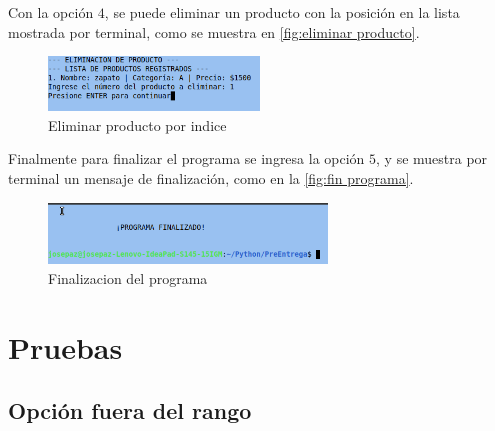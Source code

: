 \documentclass[12pt]{article}
\begin{document}
Con la opción $4$, se puede eliminar un producto con la posición en la lista mostrada por terminal, como se muestra en \autoref{fig:eliminar producto}.

\begin{figure}[H]
	\centering
	\setlength{\fboxrule}{0pt}
	\includegraphics[width=0.5\textwidth]{Imagenes/img5.png}
	\caption{Eliminar producto por indice}
	\label{fig:eliminar producto}
\end{figure} 

Finalmente para finalizar el programa se ingresa la opción $5$, y se muestra por terminal un mensaje de finalización, como en la \autoref{fig:fin programa}.
\begin{figure}[H]
	\centering
	\setlength{\fboxrule}{0pt}
	\includegraphics[width=0.66\textwidth]{Imagenes/img6.png}
	\caption{Finalizacion del programa}
	\label{fig:fin programa}
\end{figure} 

\section{Pruebas}

\subsection{Opción fuera del rango}
\end{document}
